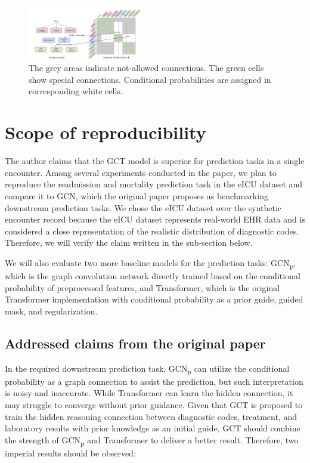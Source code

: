 \documentclass[11pt,a4paper]{article}
\begin{document}
\begin{figure}
    \centering
    \includegraphics[width=0.45\textwidth]{GCT conditional probability matrix.png}
    \caption{The grey areas indicate not-allowed connections. The green cells show special connections. Conditional probabilities are assigned in corresponding white cells. \citep{DBLP:conf/aaai/ChoiXLDFXD20}}
    \label{fig:gct-p}
\end{figure}

\section{Scope of reproducibility}
The author claims that the GCT model is superior for prediction tasks in a single encounter. Among several experiments conducted in the paper, we plan to reproduce the readmission and mortality prediction task in the eICU dataset and compare it to GCN, which the original paper proposes as benchmarking downstream prediction tasks. We chose the eICU dataset over the synthetic encounter record because the eICU dataset represents real-world EHR data and is considered a close representation of the realistic distribution of diagnostic codes. Therefore, we will verify the claim written in the sub-section below.

We will also evaluate two more baseline models for the prediction tasks: GCN\textsubscript{p}, which is the graph convolution network directly trained based on the conditional probability of preprocessed features, and Transformer, which is the original Transformer implementation with conditional probability as a prior guide, guided mask, and regularization.

\subsection{Addressed claims from the original paper}
In the required downstream prediction task, GCN\textsubscript{p} can utilize the conditional probability as a graph connection to assist the prediction, but such interpretation is noisy and inaccurate. While Transformer can learn the hidden connection, it may struggle to converge without prior guidance. Given that GCT is proposed to train the hidden reasoning connection between diagnostic codes, treatment, and laboratory results with prior knowledge as an initial guide, GCT should combine the strength of GCN\textsubscript{p} and Transformer to deliver a better result. Therefore, two imperial results should be observed:
\end{document}
